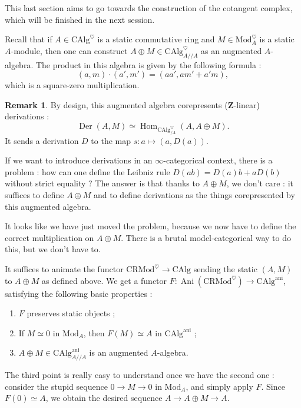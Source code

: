 \documentclass[11pt]{article}
\theoremstyle{definition}
\newtheorem{remark}[theorem]{Remark}
\newcommand{\Ani}{\operatorname{Ani}}
\newcommand{\ani}{\mathrm{ani}}
\newcommand{\CAlg}{\mathrm{CAlg}}
\newcommand{\CRMod}{\mathrm{CRMod}}
\newcommand{\Der}{\operatorname{Der}}
\newcommand{\heart}{\heartsuit}
\newcommand{\Hom}{\operatorname{Hom}}
\newcommand{\Mod}{\mathrm{Mod}}
\newcommand{\Z}{\mathbf{Z}}
\begin{document}
This last section aims to go towards the construction of the cotangent complex, which will be finished in the next session.

Recall that if $A \in \CAlg^{\heart}$ is a static commutative ring and $M \in \Mod_A^{\heart}$ is a static $A$-module, then one can construct $A \oplus M \in \CAlg_{A//A}^{\heart}$ as an augmented $A$-algebra.
The product in this algebra is given by the following formula :
\[
    (a, m) \cdot (a', m') = (aa', am' + a'm),
\]
which is a square-zero multiplication.

\begin{remark}
    By design, this augmented algebra corepresents ($\Z$-linear) derivations :
    \[
        \Der(A, M) \simeq \Hom_{\CAlg_{/A}^{\heart}}(A, A \oplus M).
    \]
    It sends a derivation $D$ to the map $s : a \mapsto (a, D(a))$.
\end{remark}
If we want to introduce derivations in an $\infty$-categorical context, there is a problem : how can one define the Leibniz rule $D(ab) = D(a)b + aD(b)$ without strict equality ?
The answer is that thanks to $A \oplus M$, we don't care : it suffices to define $A \oplus M$ and to define derivations as the things corepresented by this augmented algebra.

It looks like we have just moved the problem, because we now have to define the correct multiplication on $A \oplus M$.
There is a brutal model-categorical way to do this, but we don't have to.

It suffices to animate the functor $\CRMod^{\heart} \to \CAlg$ sending the static $(A, M)$ to $A \oplus M$ as defined above.
We get a functor $F : \Ani(\CRMod^{\heart}) \to \CAlg^{\ani}$, satisfying the following basic properties :
\begin{enumerate}
    \item $F$ preserves static objects ;
    \item If $M \simeq 0$ in $\Mod_A$, then $F(M) \simeq A$ in $\CAlg^{\ani}$ ;
    \item $A \oplus M \in \CAlg_{A//A}^{\ani}$ is an augmented $A$-algebra.
\end{enumerate}

The third point is really easy to understand once we have the second one : consider the stupid sequence $0 \to M \to 0$ in $\Mod_A$, and simply apply $F$.
Since $F(0) \simeq A$, we obtain the desired sequence $A \to A \oplus M \to A$.
\end{document}
